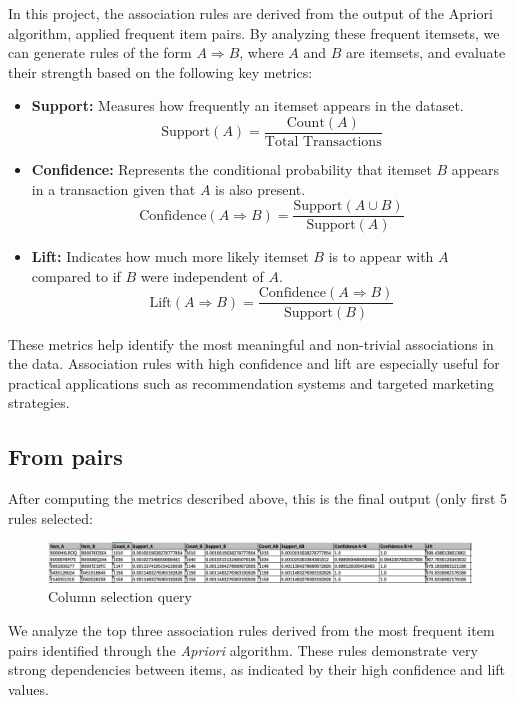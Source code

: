 \documentclass[a4paper,12pt]{article}
\begin{document}
In this project, the association rules are derived from the output of the Apriori algorithm, applied frequent item pairs. By analyzing these frequent itemsets, we can generate rules of the form $A \Rightarrow B$, where $A$ and $B$ are itemsets, and evaluate their strength based on the following key metrics:

\begin{itemize}
    \item \textbf{Support:} Measures how frequently an itemset appears in the dataset.
    \[
    \text{Support}(A) = \frac{\text{Count}(A)}{\text{Total Transactions}}
    \]
    
    \item \textbf{Confidence:} Represents the conditional probability that itemset $B$ appears in a transaction given that $A$ is also present.
    \[
    \text{Confidence}(A \Rightarrow B) = \frac{\text{Support}(A \cup B)}{\text{Support}(A)}
    \]
    
    \item \textbf{Lift:} Indicates how much more likely itemset $B$ is to appear with $A$ compared to if $B$ were independent of $A$.
    \[
    \text{Lift}(A \Rightarrow B) = \frac{\text{Confidence}(A \Rightarrow B)}{\text{Support}(B)}
    \]
\end{itemize}

These metrics help identify the most meaningful and non-trivial associations in the data. Association rules with high confidence and lift are especially useful for practical applications such as recommendation systems and targeted marketing strategies.

\subsection{From pairs}

After computing the metrics described above, this is the final output (only first 5 rules selected:
\begin{figure}[h]
    \includegraphics[width=18cm]{images/assoc_rules.png}
    \caption{Column selection query}
\end{figure}

We analyze the top three association rules derived from the most frequent item pairs identified through the \textit{Apriori} algorithm. These rules demonstrate very strong dependencies between items, as indicated by their high confidence and lift values.
\end{document}
